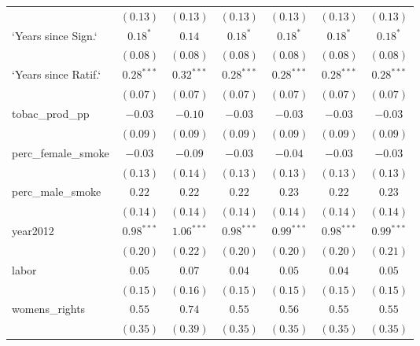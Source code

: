 \begin{table}[!h]
\begin{center}
\begin{tabular}{l c c c c c c }
                        & $(0.13)$     & $(0.13)$     & $(0.13)$     & $(0.13)$     & $(0.13)$     & $(0.13)$     \\
`Years since Sign.`     & $0.18^{*}$   & $0.14$       & $0.18^{*}$   & $0.18^{*}$   & $0.18^{*}$   & $0.18^{*}$   \\
                        & $(0.08)$     & $(0.08)$     & $(0.08)$     & $(0.08)$     & $(0.08)$     & $(0.08)$     \\
`Years since Ratif.`    & $0.28^{***}$ & $0.32^{***}$ & $0.28^{***}$ & $0.28^{***}$ & $0.28^{***}$ & $0.28^{***}$ \\
                        & $(0.07)$     & $(0.07)$     & $(0.07)$     & $(0.07)$     & $(0.07)$     & $(0.07)$     \\
tobac\_prod\_pp         & $-0.03$      & $-0.10$      & $-0.03$      & $-0.03$      & $-0.03$      & $-0.03$      \\
                        & $(0.09)$     & $(0.09)$     & $(0.09)$     & $(0.09)$     & $(0.09)$     & $(0.09)$     \\
perc\_female\_smoke     & $-0.03$      & $-0.09$      & $-0.03$      & $-0.04$      & $-0.03$      & $-0.03$      \\
                        & $(0.13)$     & $(0.14)$     & $(0.13)$     & $(0.13)$     & $(0.13)$     & $(0.13)$     \\
perc\_male\_smoke       & $0.22$       & $0.22$       & $0.22$       & $0.23$       & $0.22$       & $0.23$       \\
                        & $(0.14)$     & $(0.14)$     & $(0.14)$     & $(0.14)$     & $(0.14)$     & $(0.14)$     \\
year2012                & $0.98^{***}$ & $1.06^{***}$ & $0.98^{***}$ & $0.99^{***}$ & $0.98^{***}$ & $0.99^{***}$ \\
                        & $(0.20)$     & $(0.22)$     & $(0.20)$     & $(0.20)$     & $(0.20)$     & $(0.21)$     \\
labor                   & $0.05$       & $0.07$       & $0.04$       & $0.05$       & $0.04$       & $0.05$       \\
                        & $(0.15)$     & $(0.16)$     & $(0.15)$     & $(0.15)$     & $(0.15)$     & $(0.15)$     \\
womens\_rights          & $0.55$       & $0.74$       & $0.55$       & $0.56$       & $0.55$       & $0.55$       \\
                        & $(0.35)$     & $(0.39)$     & $(0.35)$     & $(0.35)$     & $(0.35)$     & $(0.35)$     \\

\end{tabular}
\end{center}
\end{table}
